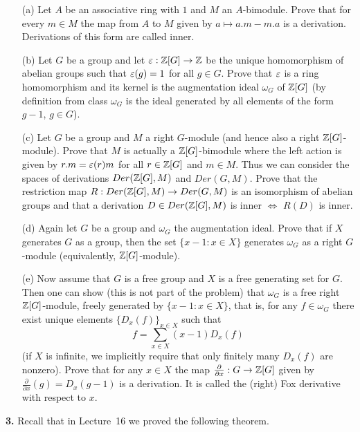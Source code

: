 \documentclass[12pt]{amsart}
\begin{document}
\begin{itemize}
\item[(a)] Let $A$ be an associative ring with $1$ and $M$ an $A$-bimodule. Prove that for every $m\in M$
the map from $A$ to $M$ given by $a\mapsto a.m-m.a$ is a derivation. Derivations of this form are called inner.
\item[(b)] Let $G$ be a group and let ${\varepsilon}:{\mathbb Z}[G]\to {\mathbb Z}$ be the unique homomorphism of abelian groups such that
${\varepsilon}(g)=1$ for all $g\in G$. Prove that ${\varepsilon}$ is a ring homomorphism and its kernel is the augmentation ideal $\omega_G$ of ${\mathbb Z}[G]$ (by definition from class $\omega_G$ is the ideal generated by all elements of the form $g-1$, $g\in G$).
\item[(c)] Let $G$ be a group and $M$ a right $G$-module (and hence also a right ${\mathbb Z}[G]$-module). Prove that
$M$ is actually a ${\mathbb Z}[G]$-bimodule where the left action is given by $r.m={\varepsilon}(r)m$ for all $r\in {\mathbb Z}[G]$ 
and $m\in M$. Thus we can consider the spaces of derivations $Der({\mathbb Z}[G],M)$ and $Der(G,M)$.
Prove that the restriction map $R:Der({\mathbb Z}[G],M)\to Der(G,M)$ is an isomorphism of
abelian groups and that a derivation $D\in Der({\mathbb Z}[G],M)$ is inner $\iff$ $R(D)$ is inner.
\item[(d)] Again let $G$ be a group and $\omega_G$ the augmentation ideal. Prove that if $X$ generates $G$ as a group, then the
set $\{x-1: x\in X\}$ generates $\omega_G$ as a right $G$-module (equivalently, ${\mathbb Z}[G]$-module).
\item[(e)] Now assume that $G$ is a free group and $X$ is a free generating set for $G$. Then one can show (this is not part of the problem) that
$\omega_G$ is a free right ${\mathbb Z}[G]$-module, freely generated by $\{x-1: x\in X\}$, that is, for any $f\in \omega_G$ there
exist unique elements $\{D_x(f)\}_{x\in X}$ such that $$f=\sum\limits_{x\in X} (x-1)D_x(f)$$ (if $X$ is infinite, we implicitly require that only finitely many $D_x(f)$ are nonzero). Prove that for any $x\in X$ the map $\frac{\partial}{\partial x}: G\to {\mathbb Z}[G]$
given by $\frac{\partial }{\partial x}(g)=D_x(g-1)$ is a derivation. It is called the (right) {Fox derivative} with respect to $x$.
\end{itemize}
\skv

{\bf 3.} Recall that in Lecture~16 we proved the following theorem. 
\end{document}
